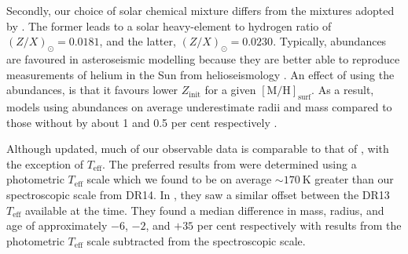\documentclass[fleqn,usenatbib]{mnras}
\newcommand{\metallicity}{\ensuremath{[\mathrm{M}/\mathrm{H}]}}
\newcommand{\teff}{\ensuremath{T_\mathrm{eff}}}
\begin{document}
Secondly, our choice of \citet{Asplund.Grevesse.ea2009} solar chemical mixture differs from the \citet{Grevesse.Sauval1998} mixtures adopted by . The former leads to a solar heavy-element to hydrogen ratio of $(Z/X)_\odot = 0.0181$, and the latter, $(Z/X)_\odot = 0.0230$. Typically, \citet{Grevesse.Sauval1998} abundances are favoured in asteroseismic modelling because they are better able to reproduce measurements of helium in the Sun from helioseismology \citep{Serenelli.Basu.ea2009}. An effect of using the \citet{Asplund.Grevesse.ea2009} abundances, is that it favours lower $Z_\mathrm{init}$ for a given $\metallicity_\mathrm{surf}$. As a result, models using \citet{Grevesse.Sauval1998} abundances on average underestimate radii and mass compared to those without by about 1 and 0.5 per cent respectively \citep{Nsamba.Campante.ea2018}.

Although updated, much of our observable data is comparable to that of , with the exception of $\teff$. The preferred results from  were determined using a photometric $\teff$ scale which we found to be on average $\sim \SI{170}{\kelvin}$ greater than our spectroscopic scale from DR14. In , they saw a similar offset between the DR13 $\teff$ available at the time. They found a median difference in mass, radius, and age of approximately $-6$, $-2$, and $+35$ per cent respectively with results from the photometric $\teff$ scale subtracted from the spectroscopic scale.
\end{document}
